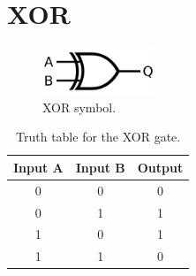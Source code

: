 \section{XOR}
	\begin{figure}[H]
	    \centering
	    \includegraphics[width=0.3\textwidth]{figures/symbols/XOR.png}
	    \caption{XOR symbol.}
	    \label{fig:XOR_sym} 
	\end{figure}

    \begin{table}[ht]
    \centering
    \begin{tabular}{|c|c|c|}
        \hline
        Input A & Input B & Output \\
        \hline
        0 & 0 & 0 \\
        0 & 1 & 1 \\
        1 & 0 & 1 \\
        1 & 1 & 0 \\
        \hline
    \end{tabular}
    \caption{Truth table for the XOR gate.}
    \end{table}    